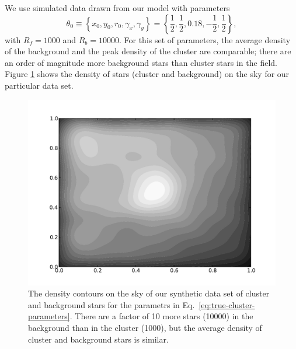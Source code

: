 \documentclass[aps,prd]{revtex4-1}
\begin{document}
We use simulated data drawn from our model with parameters
\begin{equation}
\label{eq:true-cluster-parameters}
\theta_0 \equiv \left\{ x_0, y_0, r_0, \gamma_x, \gamma_y \right\} =
\left\{ \frac{1}{2}, \frac{1}{2}, 0.18, -\frac{1}{2}, \frac{1}{2}
\right\},
\end{equation}
with $R_f = 1000$ and $R_b = 10000$.  For this set of parameters, the
average density of the background and the peak density of the cluster
are comparable; there are an order of magnitude more background stars
than cluster stars in the field.  Figure \ref{fig:sky-density} shows
the density of stars (cluster and background) on the sky for our
particular data set.

\begin{figure}
  \includegraphics[width=\columnwidth]{sky-density}
  \caption{\label{fig:sky-density} The density contours on the sky of
    our synthetic data set of cluster and background stars for the
    parametrs in Eq.~\eqref{eq:true-cluster-parameters}.  There are a
    factor of 10 more stars (10000) in the background than in the
    cluster (1000), but the average density of cluster and background
    stars is similar.}
\end{figure}
\end{document}
